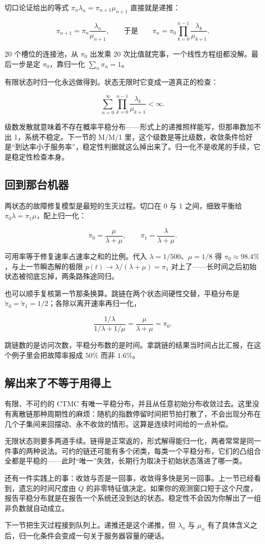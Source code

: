 切口论证给出的等式 \(\pi_n\lambda_n=\pi_{n+1}\mu_{n+1}\) 直接就是递推：

\[
\pi_{n+1}=\pi_n\frac{\lambda_n}{\mu_{n+1}},
\qquad\text{于是}\qquad
\pi_n=\pi_0\prod_{k=0}^{n-1}\frac{\lambda_k}{\mu_{k+1}}.
\]

20 个槽位的连接池，从 \(\pi_0\) 出发乘 20 次比值就完事，一个线性方程组都没解。最后一步是定 \(\pi_0\)，靠归一化 \(\sum_n\pi_n=1\)。

有限状态时归一化永远做得到。状态无限时它变成一道真正的检查：

\[
\sum_{n=0}^{\infty}\prod_{k=0}^{n-1}\frac{\lambda_k}{\mu_{k+1}}<\infty.
\]

级数发散就意味着不存在概率平稳分布——形式上的递推照样能写，但那串数加不出 1，系统不稳定。下一节的 M/M/1 里，这个级数是等比级数，收敛条件恰好是``到达率小于服务率''，稳定性判据就这么掉出来了。归一化不是收尾的手续，它是稳定性检查本身。

\subsection{回到那台机器}

两状态的故障修复模型是最短的生灭过程。切口在 0 与 1 之间，细致平衡给 \(\pi_0\lambda=\pi_1\mu\)，配上归一化：

\[
\pi_0=\frac{\mu}{\lambda+\mu},\qquad \pi_1=\frac{\lambda}{\lambda+\mu}.
\]

可用率等于修复速率占速率之和的比例。代入 \(\lambda=1/500\)、\(\mu=1/8\) 得 \(\pi_0\approx 98.4\%\)，与上一节瞬态解的极限 \(p(t)\to\lambda/(\lambda+\mu)=\pi_1\) 对上了——长时间之后初始状态被彻底忘掉，两条路殊途同归。

也可以顺手复核第一节那条换算。跳链在两个状态间硬性交替，平稳分布是 \(\widetilde\pi_0=\widetilde\pi_1=1/2\)；各除以离开速率再归一化，

\[
\frac{1/\lambda}{1/\lambda+1/\mu}=\frac{\mu}{\lambda+\mu}=\pi_0.
\]

跳链数的是访问次数，平稳分布数的是时间。拿跳链的结果当时间占比汇报，在这个例子里会把故障率报成 \(50\%\) 而非 \(1.6\%\)。

\subsection{解出来了不等于用得上}

有限、不可约的 CTMC 有唯一平稳分布，并且从任意初始分布收敛过去。这里没有离散链那种周期性的麻烦：随机的指数停留时间把节拍打散了，不会出现分布在几个子集间来回摆动、永不收敛的情形。这算是连续时间给的一点补偿。

无限状态则要多两道手续。链得是正常返的，形式解得能归一化，两者常常是同一件事的两种说法。可约的链还可能有多个闭类，每类一个平稳分布，它们的凸组合全都是平稳的——此时``唯一''失效，长期行为取决于初始状态落进了哪一类。

还有一件实践上的事：收敛与否是一回事，收敛得多快是另一回事。上一节已经看到，遗忘的时间尺度由 \(Q\) 的非零特征值决定。如果你的观测窗口短于这个尺度，报告平稳分布就是在报告一个系统还没到达的状态。稳定性不会因为你解出了一组非负数就自动成立。

下一节把生灭过程接到队列上。递推还是这个递推，但 \(\lambda_n\) 与 \(\mu_n\) 有了具体含义之后，归一化条件会变成一句关于服务器容量的硬话。
